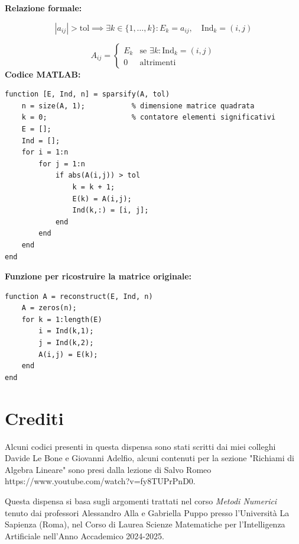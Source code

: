 \documentclass[12pt,a4paper]{article}
\begin{document}
\vspace{1em}
\textbf{Relazione formale:}

\[
|a_{ij}| > \text{tol} \implies \exists k \in \{1,\dots,k\} : E_k = a_{ij}, \quad \text{Ind}_k = (i,j)
\]

\[
A_{ij} = 
\begin{cases}
E_k & \text{se } \exists k: \text{Ind}_k = (i,j) \\
0 & \text{altrimenti}
\end{cases}
\]
\newpage
\textbf{Codice MATLAB:}

\begin{verbatim}
function [E, Ind, n] = sparsify(A, tol)
    n = size(A, 1);           % dimensione matrice quadrata
    k = 0;                    % contatore elementi significativi
    E = [];
    Ind = [];
    for i = 1:n
        for j = 1:n
            if abs(A(i,j)) > tol
                k = k + 1;
                E(k) = A(i,j);
                Ind(k,:) = [i, j];
            end
        end
    end
end
\end{verbatim}

\bigskip

\textbf{Funzione per ricostruire la matrice originale:}

\begin{verbatim}
function A = reconstruct(E, Ind, n)
    A = zeros(n);
    for k = 1:length(E)
        i = Ind(k,1);
        j = Ind(k,2);
        A(i,j) = E(k);
    end
end
\end{verbatim}


\newpage
\section*{Crediti}

Alcuni codici presenti in questa dispensa sono stati scritti dai miei colleghi Davide Le Bone e Giovanni Adelfio, alcuni contenuti per la sezione "Richiami di Algebra Lineare" sono presi dalla lezione di Salvo Romeo https://www.youtube.com/watch?v=fy8TUPrPnD0.

Questa dispensa si basa sugli argomenti trattati nel corso \textit{Metodi Numerici} tenuto dai professori Alessandro Alla e Gabriella Puppo presso l'Università La Sapienza (Roma), nel Corso di Laurea Scienze Matematiche per l'Intelligenza Artificiale nell'Anno Accademico 2024-2025.
\end{document}
